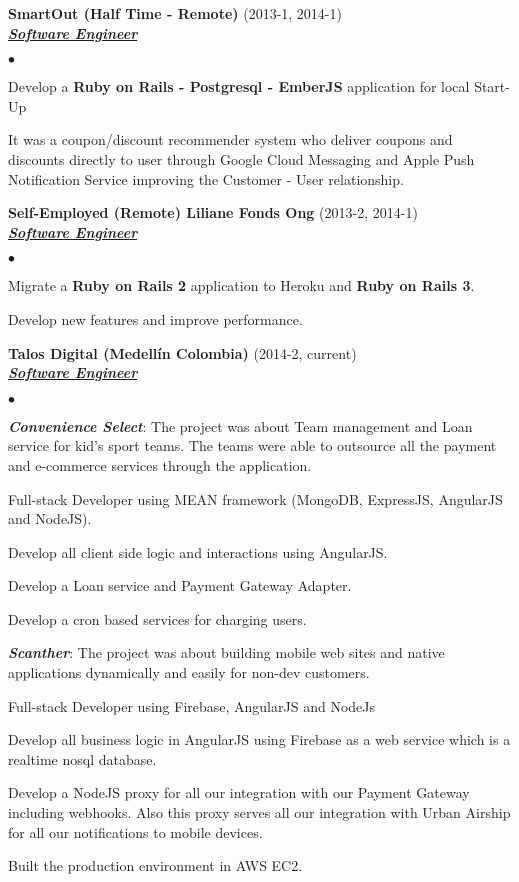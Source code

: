 \documentclass[a4paper]{article}
\newcommand{\employer}[3]{{
\textbf{#1} (#2)\\ \underline{\textbf{\emph{#3}}}\\ }}
\newenvironment{achievements}{\begin{list}{$\bullet$}{\topsep 0pt \itemsep
-2pt}}{\vspace*{4pt}\end{list}}
\newcommand{\programming}[1]{{\textbf{#1}}}
\newcommand{\emphasys}[1]{\textbf{\emph{#1}}}
\begin{document}
\employer{ SmartOut (Half Time - Remote)}{2013-1, 2014-1}{Software Engineer}
\begin{achievements}
\item Develop a \programming{Ruby on Rails - Postgresql - EmberJS} application for local Start-Up
\item It was a coupon/discount recommender system who deliver coupons and discounts directly to user through Google Cloud Messaging and Apple Push Notification Service improving the Customer - User relationship.
\end{achievements}

\employer{ Self-Employed (Remote)  Liliane Fonds Ong}{2013-2, 2014-1}{Software Engineer}
\begin{achievements}
\item Migrate a \programming{Ruby on Rails 2} application to Heroku and \programming{Ruby on Rails 3}.
\item Develop new features and improve performance.
\end{achievements}

\employer{ Talos Digital (Medell\'in Colombia)}{2014-2, current}{Software Engineer}
\begin{achievements}
\item \emphasys{Convenience Select}: The project was about Team management and Loan service for kid's sport teams. The teams were able to outsource all the payment and e-commerce services through the application.
\item Full-stack Developer using MEAN framework  (MongoDB, ExpressJS, AngularJS and NodeJS).
\item Develop all client side logic and interactions using AngularJS.
\item Develop a Loan service and Payment Gateway Adapter.
\item Develop a cron based services for charging users.
\item \emphasys{Scanther}: The project was about building mobile web sites and native applications dynamically and easily for non-dev customers.
\item Full-stack Developer using Firebase, AngularJS and NodeJs
\item Develop all business logic in AngularJS using Firebase as a web service which is a realtime nosql database.
\item Develop a NodeJS proxy for all our integration with our Payment Gateway including webhooks. Also this proxy serves all our integration with Urban Airship for all our notifications to mobile devices.
\item Built the production environment in AWS EC2.
\end{achievements}
\end{document}
